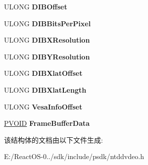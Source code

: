 \begin{DoxyCompactItemize}
U\+L\+O\+NG {\bfseries D\+I\+B\+Offset}
\item 
\mbox{\label{struct___v_i_d_e_o___h_a_r_d_w_a_r_e___s_t_a_t_e___h_e_a_d_e_r_a7e520e8a58e55763cbcac3620b069398}} 
U\+L\+O\+NG {\bfseries D\+I\+B\+Bits\+Per\+Pixel}
\item 
\mbox{\label{struct___v_i_d_e_o___h_a_r_d_w_a_r_e___s_t_a_t_e___h_e_a_d_e_r_a80ee54e179ebc55f78a301b487122a7e}} 
U\+L\+O\+NG {\bfseries D\+I\+B\+X\+Resolution}
\item 
\mbox{\label{struct___v_i_d_e_o___h_a_r_d_w_a_r_e___s_t_a_t_e___h_e_a_d_e_r_a8ec6131627166b589e637f60663a7400}} 
U\+L\+O\+NG {\bfseries D\+I\+B\+Y\+Resolution}
\item 
\mbox{\label{struct___v_i_d_e_o___h_a_r_d_w_a_r_e___s_t_a_t_e___h_e_a_d_e_r_a1834911eccfb603ef7bdcd065eceafd2}} 
U\+L\+O\+NG {\bfseries D\+I\+B\+Xlat\+Offset}
\item 
\mbox{\label{struct___v_i_d_e_o___h_a_r_d_w_a_r_e___s_t_a_t_e___h_e_a_d_e_r_a9ee7b8cbf6cd89296758a0323172f2ec}} 
U\+L\+O\+NG {\bfseries D\+I\+B\+Xlat\+Length}
\item 
\mbox{\label{struct___v_i_d_e_o___h_a_r_d_w_a_r_e___s_t_a_t_e___h_e_a_d_e_r_aadf7ff484f9582e63dcd087c7950a031}} 
U\+L\+O\+NG {\bfseries Vesa\+Info\+Offset}
\item 
\mbox{\label{struct___v_i_d_e_o___h_a_r_d_w_a_r_e___s_t_a_t_e___h_e_a_d_e_r_ac4a3a960d95ad5009330d88595745cdf}} 
\hyperlink{interfacevoid}{P\+V\+O\+ID} {\bfseries Frame\+Buffer\+Data}
\end{DoxyCompactItemize}


该结构体的文档由以下文件生成\+:\begin{DoxyCompactItemize}
\item 
E\+:/\+React\+O\+S-\/0../sdk/include/psdk/ntddvdeo.\+h\end{DoxyCompactItemize}
